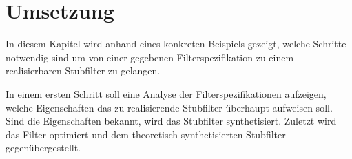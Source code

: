 \section{Umsetzung}

In diesem Kapitel wird anhand eines konkreten Beispiels gezeigt, welche Schritte notwendig sind um von einer gegebenen Filterspezifikation zu einem realisierbaren Stubfilter zu gelangen.

In einem ersten Schritt soll eine Analyse der Filterspezifikationen aufzeigen, welche Eigenschaften das zu realisierende Stubfilter überhaupt aufweisen soll. Sind die Eigenschaften bekannt, wird das Stubfilter synthetisiert. Zuletzt wird das Filter optimiert und dem theoretisch synthetisierten Stubfilter gegenübergestellt.  






